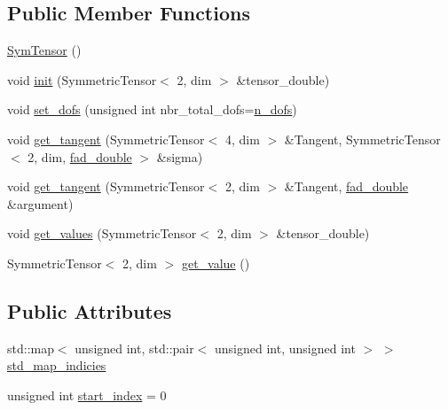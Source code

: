 \subsection*{Public Member Functions}
\begin{DoxyCompactItemize}
\item 
\hyperlink{classSacado__Wrapper_1_1SymTensor_a4e7ec32177eb891e3f1a32a16bcd59f5}{Sym\+Tensor} ()
\item 
void \hyperlink{classSacado__Wrapper_1_1SymTensor_acbad579d5ead9e96ff46aa15d9b5aef4}{init} (Symmetric\+Tensor$<$ 2, dim $>$ \&tensor\+\_\+double)
\item 
void \hyperlink{classSacado__Wrapper_1_1SymTensor_aa9e0fcc9d4e0a4120bedb8ef9b8d7ecb}{set\+\_\+dofs} (unsigned int nbr\+\_\+total\+\_\+dofs=\hyperlink{classSacado__Wrapper_1_1SymTensor_a733bc4b029ff8d067b48e7ce3ee7606b}{n\+\_\+dofs})
\item 
void \hyperlink{classSacado__Wrapper_1_1SymTensor_ab97427c3b5cab279e58607cf431ab262}{get\+\_\+tangent} (Symmetric\+Tensor$<$ 4, dim $>$ \&Tangent, Symmetric\+Tensor$<$ 2, dim, \hyperlink{Sacado__example_8cc_a868b94676739e612d9c95940e70892a9}{fad\+\_\+double} $>$ \&sigma)
\item 
void \hyperlink{classSacado__Wrapper_1_1SymTensor_ac0ab9caa8c54102e24c4d007f820873b}{get\+\_\+tangent} (Symmetric\+Tensor$<$ 2, dim $>$ \&Tangent, \hyperlink{Sacado__example_8cc_a868b94676739e612d9c95940e70892a9}{fad\+\_\+double} \&argument)
\item 
void \hyperlink{classSacado__Wrapper_1_1SymTensor_afbab1ce0f846f026f5bd8b449180b5e9}{get\+\_\+values} (Symmetric\+Tensor$<$ 2, dim $>$ \&tensor\+\_\+double)
\item 
Symmetric\+Tensor$<$ 2, dim $>$ \hyperlink{classSacado__Wrapper_1_1SymTensor_ade8f6c8cb25c2b6e2baac06ef638c293}{get\+\_\+value} ()
\end{DoxyCompactItemize}
\subsection*{Public Attributes}
\begin{DoxyCompactItemize}
\item 
std\+::map$<$ unsigned int, std\+::pair$<$ unsigned int, unsigned int $>$ $>$ \hyperlink{classSacado__Wrapper_1_1SymTensor_ae3b1c56cde3fc5c7805b618ef3d9de75}{std\+\_\+map\+\_\+indicies}
\item 
unsigned int \hyperlink{classSacado__Wrapper_1_1SymTensor_afe921e6044e4110fcfc848c52844d650}{start\+\_\+index} = 0
\end{DoxyCompactItemize}
